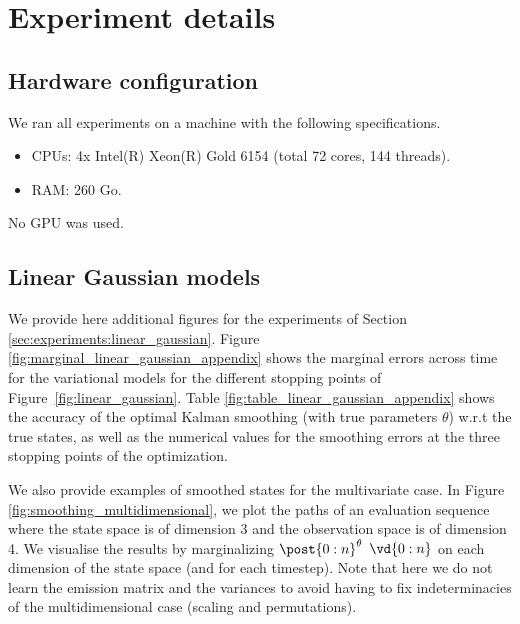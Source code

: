 \documentclass{article}
\begin{document}
\section{Experiment details}
\subsection{Hardware configuration}

We ran all experiments on a machine with the following specifications.
\begin{itemize}
    \item CPUs: 4x Intel(R) Xeon(R) Gold 6154 (total 72 cores, 144 threads).
    \item RAM: 260 Go. 
\end{itemize}

No GPU was used. 
\subsection{Linear Gaussian models}
We provide here additional figures for the experiments of Section \ref{sec:experiments:linear_gaussian}. Figure \ref{fig:marginal_linear_gaussian_appendix} shows the marginal errors across time for the variational models for the different stopping points of Figure~\ref{fig:linear_gaussian}. Table \ref{fig:table_linear_gaussian_appendix} shows the accuracy of the optimal Kalman smoothing (with true parameters $\theta$) w.r.t the true states, as well as the numerical values for the smoothing errors at the three stopping points of the optimization.

We also provide examples of smoothed states for the multivariate case. In Figure \ref{fig:smoothing_multidimensional}, we plot the paths of an evaluation sequence where the state space is of dimension 3 and the observation space is of dimension 4. We visualise the results by marginalizing $\post{0:n}^\parvec$ $\vd{0:n}$ on each dimension of the state space (and for each timestep). Note that here we do not learn the emission matrix and the variances to avoid having to fix indeterminacies of the multidimensional case (scaling and permutations).
\end{document}
